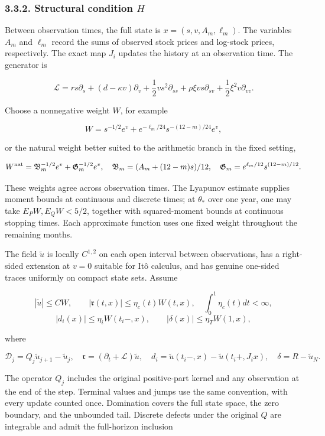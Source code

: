 \documentclass[a4paper,11pt]{article}
\begin{document}
\subsubsection*{3.3.2. Structural condition $H$}

Between observation times, the full state is \(x=(s,v,A_m,\ell_m)\). The variables \(A_m\) and \(\ell_m\) record the sums of observed stock prices and log-stock prices, respectively. The exact map \(J_i\) updates the history at an observation time. The generator is

\[
\mathcal L=rs\partial_s+(d-\kappa v)\partial_v
+\frac12vs^2\partial_{ss}+\rho\xi vs\partial_{sv}
+\frac12\xi^2v\partial_{vv}.
\]

Choose a nonnegative weight \(W\), for example

\[
W=s^{-1/2}e^v+e^{-\ell_m/24}s^{-(12-m)/24}e^v,
\]

or the natural weight better suited to the arithmetic branch in the fixed setting,

\[
W^{\rm nat}=\mathfrak B_m^{-1/2}e^v+\mathfrak G_m^{-1/2}e^v,
\quad \mathfrak B_m=(A_m+(12-m)s)/12,
\quad \mathfrak G_m=e^{\ell_m/12}s^{(12-m)/12}.
\]

These weights agree across observation times. The Lyapunov estimate supplies moment bounds at continuous and discrete times; at $\theta_*$ over one year, one may take $E_PW,E_QW<5/2$, together with squared-moment bounds at continuous stopping times. Each approximate function uses one fixed weight throughout the remaining months.

The field $\widetilde u$ is locally $C^{1,2}$ on each open interval between observations, has a right-sided extension at $v=0$ suitable for Itô calculus, and has genuine one-sided traces uniformly on compact state sets. Assume

\[
|\widetilde u|\le CW,\qquad
|\mathfrak r(t,x)|\le\eta_c(t)W(t,x),\quad
\int_0^1\eta_c(t)dt<\infty,
\]
\[
|d_i(x)|\le\eta_iW(t_i-,x),\qquad
|\delta(x)|\le\eta_TW(1,x),
\]

where

\[
\mathscr D_j=Q_j\widetilde u_{j+1}-\widetilde u_j,
\quad \mathfrak r=(\partial_t+\mathcal L)\widetilde u,
\quad d_i=\widetilde u(t_i-,x)-\widetilde u(t_i+,J_ix),
\quad \delta=R-\widetilde u_N.
\tag{H9}
\]

The operator $Q_j$ includes the original positive-part kernel and any observation at the end of the step. Terminal values and jumps use the same convention, with every update counted once. Domination covers the full state space, the zero boundary, and the unbounded tail. Discrete defects under the original $Q$ are integrable and admit the full-horizon inclusion
\end{document}
